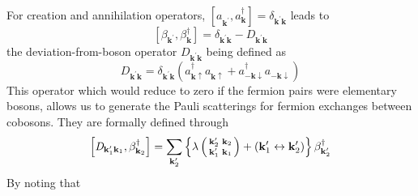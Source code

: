\documentclass[aps,prb,superscriptaddress,twocolumn]{revtex4}
\newcommand{\vk}{\ensuremath{\mathbf{k}}}
\begin{document}
For creation and annihilation operators, $\left[a^{}_{\mathbf{k}
^{\prime}},a^{\dagger}_{\mathbf{k} {}}\right]  =\delta_{\mathbf{k} ^{\prime}%
\mathbf{k} }$ leads to 
\begin{equation}  \label{eq:betacom}
\left[\beta_{\mathbf{k} ^{\prime}},\beta^{\dagger}_{\mathbf{k} }\right] 
=\delta_{\mathbf{k} ^{\prime}\mathbf{k} }-\mathit{D} _{\mathbf{k} ^{\prime}%
\mathbf{k} }
\end{equation}
the deviation-from-boson operator $\mathit{D} _{\mathbf{k} ^{\prime}\mathbf{k%
} }$ being defined as 
\begin{equation}  \label{eq:D}
\mathit{D} _{\mathbf{k} ^{\prime}\mathbf{k} }=\delta_{\mathbf{k} ^{\prime}%
\mathbf{k} }\left(a^{\dagger}_{\mathbf{k} \uparrow}a^{}_{\mathbf{k}
\uparrow}+a^{\dagger}_{-\mathbf{k} \downarrow}a^{}_{-\mathbf{k}
\downarrow}\right) 
\end{equation}
This operator which would reduce to zero if the fermion pairs were
elementary bosons, allows us to generate the Pauli scatterings for fermion
exchanges between cobosons. They are formally defined through 
\begin{equation}
\left[\mathit{D} _{\mathbf{k} ^{\prime}_1\mathbf{k} _1},\beta^{\dagger}_{%
\mathbf{k} _2}\right]  =\sum_{\mathbf{k} ^{\prime}_2}\left\{\lambda\left(%
\begin{smallmatrix}\vk'_2&\vk_2\\\vk'_1&\vk_1\end{smallmatrix}\right) 
+\left(\mathbf{k} ^{\prime}_1\leftrightarrow\mathbf{k} ^{\prime}_2\right)
\right\} \beta^{\dagger}_{\mathbf{k} ^{\prime}_2}
\end{equation}
By noting that
\end{document}
